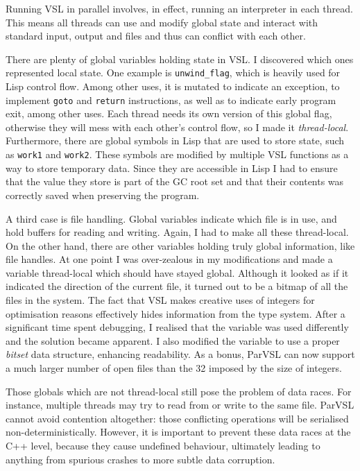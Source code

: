 Running VSL in parallel involves, in effect, running an interpreter in each thread. This means
all threads can use and modify global state and interact with standard input, output and files and
thus can conflict with each other.

There are plenty of global variables holding state in VSL. I discovered which ones represented local
state.
One example is \verb|unwind_flag|, which is heavily used for Lisp control flow. Among other uses, it is
mutated to indicate an exception, to implement \verb|goto| and \verb|return| instructions,
as well as to indicate early program exit,
among other uses. Each thread needs its own version of this global flag, otherwise they will mess with each
other's control flow, so I made it \emph{thread-local}. Furthermore, there are global symbols in Lisp
that are used to store state, such as \verb|work1| and \verb|work2|. These symbols are modified by multiple
VSL functions as a way to store temporary data. Since they are accessible in Lisp I had to ensure that the
value they store is part of the GC root set and that their contents was correctly saved when preserving
the program.

A third case is file handling. Global variables indicate which file is in use, and hold buffers for reading
and writing. Again, I had to make all these thread-local. On the other hand, there are other variables holding
truly global information, like file handles. At one point I was over-zealous in
my modifications and made a variable thread-local which should have stayed global. Although it looked as if it indicated
the direction of the current file, it turned out to be a bitmap of all the files in the system. The fact
that VSL makes creative uses of integers for optimisation reasons effectively hides information from the type system.
After a significant time spent debugging, I realised that the variable was used differently and the solution became apparent.
I also modified the variable to use a proper \emph{bitset} data structure, enhancing readability.
As a bonus, ParVSL can now support a much larger number of open files than the 32 imposed by the size of integers.

Those globals which are not thread-local still pose the problem of data races. For instance, multiple threads
may try to read from or write to the same file. ParVSL cannot avoid contention altogether: those conflicting
operations will be serialised non-deterministically. However, it is important to prevent these data races at
the C++ level, because they cause undefined behaviour, ultimately leading to anything from spurious crashes
to more subtle data corruption.

